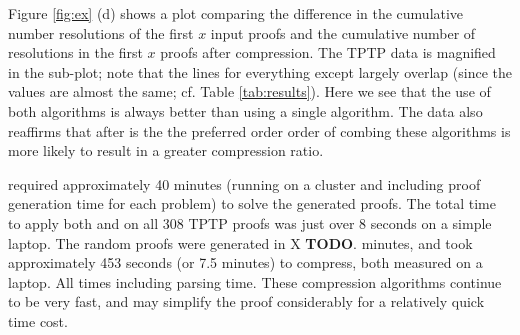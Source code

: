 {Figure \ref{fig:ex} (d) shows a plot comparing the difference in the cumulative number resolutions of the first $x$ input proofs and the cumulative number of resolutions in the first $x$ proofs after compression. The TPTP data is magnified in the sub-plot; note that the lines for everything except {\FORPI} largely overlap (since the values are almost the same; cf. Table \ref{tab:results}). Here we see that the use of both algorithms is always better than using a single algorithm. The data also reaffirms that {\FORPI} after {\GFOLU} is the the preferred order order of combing these algorithms is more likely to result in a greater compression ratio. 



{\SPASS} required approximately 40 minutes (running on a cluster and including proof generation time for each problem) to solve the generated proofs. The total time to apply both {\FORPI} and {\GFOLU} on all 308 TPTP proofs was just over 8 seconds on a simple laptop. The random proofs were generated in X {\bf TODO}. minutes, and took approximately 453 seconds (or 7.5 minutes) to compress, both measured on a laptop.
All times including parsing time. These compression algorithms continue to be very fast, and may simplify the proof considerably for a relatively quick time cost.







}

